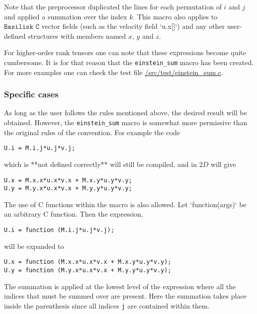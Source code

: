 Note that the preprocessor duplicated the lines for each permutation of $i$ and $j$ and applied a summation over the index $k$. This macro also applies to $\texttt{Basilisk C}$ vector fields (such as the velocity field `u.x[]`) and any other user-defined structures with members named $x$, $y$ and $z$.

For higher-order rank tensors one can note that these expressions become quite cumbersome.
It is for that reason that the \texttt{einstein\_sum} macro has been created. 
For more examples one can check the test file \href{einstein\_sum.c}{/src/test/einstein\_sum.c}.

\subsubsection{Specific cases}

As long as the user follows the rules mentioned above, the desired result will be obtained. 
However, the \texttt{einstein\_sum} macro is somewhat more permissive than the original rules of the convention. 
For example the code

\begin{lstlisting}
U.i = M.i.j*u.j*v.j;
\end{lstlisting}

which is **not defined correctly** will still be compiled, and in $2D$ will give

\begin{lstlisting}
U.x = M.x.x*u.x*v.x + M.x.y*u.y*v.y;
U.y = M.y.x*u.x*v.x + M.y.y*u.y*v.y;
\end{lstlisting}

The use of C functions within the macro is also allowed. 
Let `function(args)` be an arbitrary C function. 
Then the expression, 

\begin{lstlisting}
U.i = function (M.i.j*u.j*v.j);
\end{lstlisting}

will be expanded to

\begin{lstlisting}
U.x = function (M.x.x*u.x*v.x + M.x.y*u.y*v.y);
U.y = function (M.y.x*u.x*v.x + M.y.y*u.y*v.y);
\end{lstlisting}

The summation is applied at the lowest level of the expression where all the indices that must be summed over are present. 
Here the summation takes place inside the parenthesis since all indices \texttt{j} are contained within them. 

